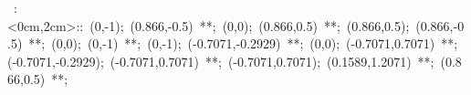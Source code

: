 \hbox{
\xy    <2cm,0cm>:<0cm,2cm>::
       (0,-1); (0.866,-0.5) **\dir{-};
       (0,0); (0.866,0.5) **\dir{-};
       (0.866,0.5); (0.866,-0.5) **\dir{-};
       (0,0); (0,-1) **\dir{-};
       (0,-1); (-0.7071,-0.2929) **\dir{-};
       (0,0); (-0.7071,0.7071) **\dir{-};
       (-0.7071,-0.2929); (-0.7071,0.7071) **\dir{-};
       (-0.7071,0.7071); (0.1589,1.2071) **\dir{-};
       (0.866,0.5)  **\dir{-};
\endxy}
